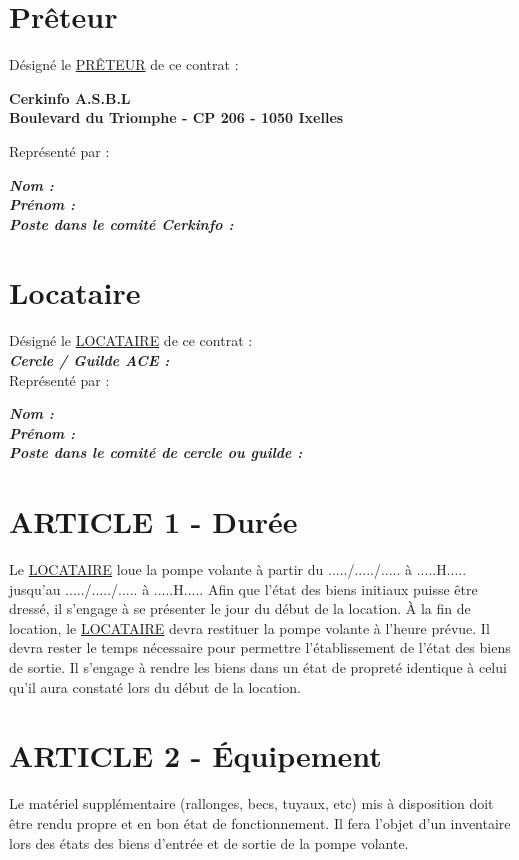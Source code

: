 \documentclass{article}
\begin{document}
\section*{Prêteur}
Désigné le \underline{PRÊTEUR} de ce contrat :

\begin{center}
    \textbf{Cerkinfo A.S.B.L}\\
    \textbf{Boulevard du Triomphe - CP 206 - 1050 Ixelles}
\end{center}
Représenté par :

    \textbf{\textit{Nom :}}\\
    
    \textbf{\textit{Prénom :}}\\
    
    \textbf{\textit{Poste dans le comité Cerkinfo :}}

\section*{Locataire}
Désigné le \underline{LOCATAIRE} de ce contrat : \\

    \textbf{\textit{Cercle / Guilde ACE :}}\\

Représenté par :

    \textbf{\textit{Nom :}}\\
    
    \textbf{\textit{Prénom :}}\\
    
    \textbf{\textit{Poste dans le comité de cercle ou guilde :}}
    
\newpage

\section*{ARTICLE 1 - Durée}
Le \underline{LOCATAIRE} loue la pompe volante à partir du ...../...../..... à .....H..... jusqu’au ...../...../..... à .....H..... 
Afin que l’état des biens initiaux puisse être dressé, il s’engage à se présenter le jour du début de la location. À la fin de location, le \underline{LOCATAIRE} devra restituer la pompe volante à l’heure prévue. Il devra rester le temps nécessaire pour permettre l’établissement de l’état des biens de sortie. Il s’engage à rendre les biens dans un état de propreté identique à celui qu’il aura constaté lors du début de la location.

\section*{ARTICLE 2 - Équipement}
Le matériel supplémentaire (rallonges, becs, tuyaux, etc) mis à disposition doit être rendu propre et en bon état de fonctionnement. Il fera l’objet d’un inventaire lors des états des biens d’entrée et de sortie de la pompe volante.
\end{document}
